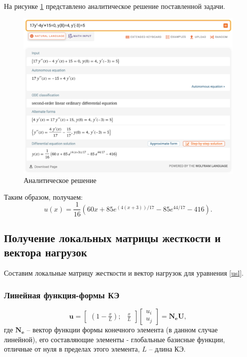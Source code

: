 На рисунке \ref{analit} представлено аналитическое решение поставленной задачи.
\begin{figure}[!h]
\begin{center}
\includegraphics[scale = 0.5]{labs/img/img1}
\end{center}
\caption{Аналитическое решение}
\label{analit}
\end{figure}

Таким образом, получаем:
$$
u(x)=\frac{1}{16}\left(60 x+85 e^{(4(x+3)) / 17}-85 e^{44 / 17}-416\right).
$$


\subsection{Получение локальных матрицы жесткости и вектора нагрузок}

Составим локальные матрицу жесткости и вектор нагрузок для уравнения \ref{usl}.

\subsubsection{Линейная функция-формы КЭ}

$$
\mathbf{u}=\begin{bmatrix}
(1-\frac{x}{L}) ; & \frac{x}{L}
\end{bmatrix}
\begin{bmatrix}
u_i \\
u_j
\end{bmatrix}
=\mathbf{N_eU},
$$
где $\mathbf{N_e}$ -- вектор функции формы конечного элемента (в данном случае линейной), его составляющие элементы - глобальные базисные функции, отличные от нуля в пределах этого элемента, $L$ -- длина КЭ.

